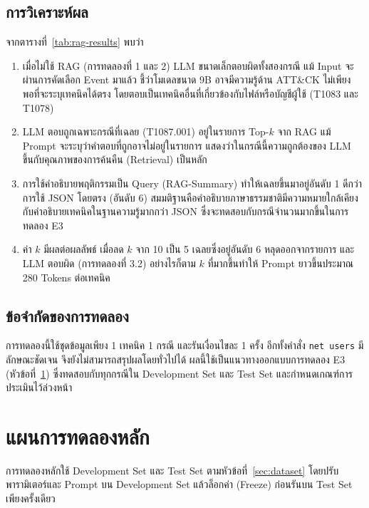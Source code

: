 \subsection{การวิเคราะห์ผล}
จากตารางที่~\ref{tab:rag-results} พบว่า
\begin{enumerate}
  \item เมื่อไม่ใช้ RAG (การทดลองที่ 1 และ 2) LLM ขนาดเล็กตอบผิดทั้งสองกรณี
        แม้ Input จะผ่านการคัดเลือก Event มาแล้ว ชี้ว่าโมเดลขนาด 9B อาจมีความรู้ด้าน ATT\&CK
        ไม่เพียงพอที่จะระบุเทคนิคได้ตรง โดยตอบเป็นเทคนิคอื่นที่เกี่ยวข้องกับไฟล์หรือบัญชีผู้ใช้ (T1083 และ T1078)
  \item LLM ตอบถูกเฉพาะกรณีที่เฉลย (T1087.001) อยู่ในรายการ Top-$k$ จาก RAG
        แม้ Prompt จะระบุว่าคำตอบที่ถูกอาจไม่อยู่ในรายการ
        แสดงว่าในกรณีนี้ความถูกต้องของ LLM ขึ้นกับคุณภาพของการค้นคืน (Retrieval) เป็นหลัก
  \item การใช้คำอธิบายพฤติกรรมเป็น Query (RAG-Summary) ทำให้เฉลยขึ้นมาอยู่อันดับ 1
        ดีกว่าการใช้ JSON โดยตรง (อันดับ 6)
        สมมติฐานคือคำอธิบายภาษาธรรมชาติมีความหมายใกล้เคียงกับคำอธิบายเทคนิคในฐานความรู้มากกว่า JSON
        ซึ่งจะทดสอบกับกรณีจำนวนมากขึ้นในการทดลอง E3
  \item ค่า $k$ มีผลต่อผลลัพธ์ เมื่อลด $k$ จาก 10 เป็น 5 เฉลยซึ่งอยู่อันดับ 6 หลุดออกจากรายการ
        และ LLM ตอบผิด (การทดลองที่ 3.2)
        อย่างไรก็ตาม $k$ ที่มากขึ้นทำให้ Prompt ยาวขึ้นประมาณ 280 Tokens ต่อเทคนิค
\end{enumerate}

\subsection{ข้อจำกัดของการทดลอง}
การทดลองนี้ใช้ชุดข้อมูลเพียง 1 เทคนิค 1 กรณี และรันเงื่อนไขละ 1 ครั้ง
อีกทั้งคำสั่ง \texttt{net users} มีลักษณะชัดเจน จึงยังไม่สามารถสรุปผลโดยทั่วไปได้
ผลนี้ใช้เป็นแนวทางออกแบบการทดลอง E3 (หัวข้อที่~\ref{sec:main-exp})
ซึ่งทดสอบกับทุกกรณีใน Development Set และ Test Set และกำหนดเกณฑ์การประเมินไว้ล่วงหน้า

\section{แผนการทดลองหลัก}
\label{sec:main-exp}

การทดลองหลักใช้ Development Set และ Test Set ตามหัวข้อที่~\ref{sec:dataset}
โดยปรับพารามิเตอร์และ Prompt บน Development Set แล้วล็อกค่า (Freeze)
ก่อนรันบน Test Set เพียงครั้งเดียว

